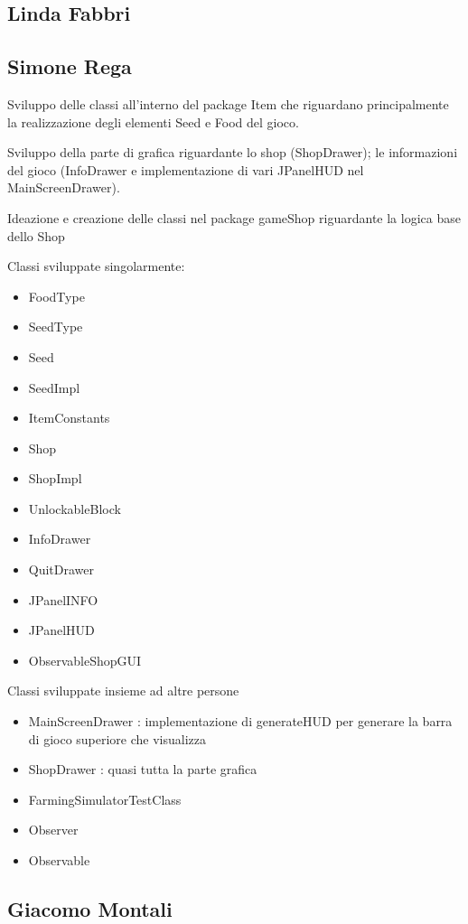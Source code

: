 \documentclass[a4paper,12pt]{report}
\begin{document}
\subsection{Linda Fabbri}

\subsection{Simone Rega}
Sviluppo delle classi all'interno del package Item che riguardano principalmente la realizzazione degli elementi Seed e Food del gioco.

Sviluppo della parte di grafica riguardante lo shop (ShopDrawer); le informazioni del gioco (InfoDrawer e implementazione di vari JPanelHUD nel MainScreenDrawer).

Ideazione e creazione delle classi nel package gameShop riguardante la logica base dello Shop

\hfill\break
Classi sviluppate singolarmente:
{
\begin{itemize}
	\item FoodType
	\item SeedType
	\item Seed
	\item SeedImpl
	\item ItemConstants
	\item Shop
	\item ShopImpl
	\item UnlockableBlock
	\item InfoDrawer
	\item QuitDrawer
	\item JPanelINFO
	\item JPanelHUD
	\item ObservableShopGUI
\end{itemize}
}
\hfill\break

Classi sviluppate insieme ad altre persone
{
\begin{itemize}
	\item MainScreenDrawer : implementazione di generateHUD per generare la barra di gioco superiore che visualizza 
	\item ShopDrawer : quasi tutta la parte grafica
	\item FarmingSimulatorTestClass 
	\item Observer
	\item Observable
\end{itemize}
}

\subsection{Giacomo Montali}
\end{document}
